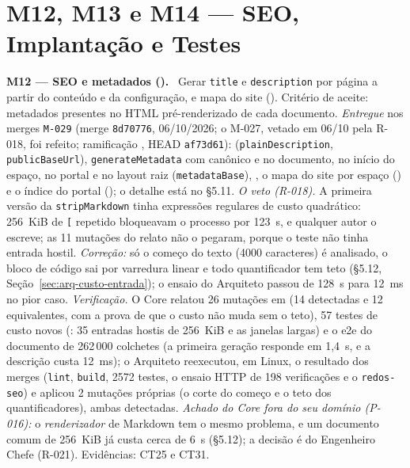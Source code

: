 \section{M12, M13 e M14 --- SEO, Implantação e Testes}\label{sec:impl-demais}

\textbf{M12 --- SEO e metadados ().} \ Gerar \texttt{title} e \texttt{description} por página a partir do conteúdo e da configuração,  e mapa do site (). Critério de aceite: metadados presentes no HTML pré-renderizado de cada documento. \emph{Entregue} nos merges \texttt{M-029} (merge \texttt{8d70776}, 06/10/2026; o M-027, vetado em 06/10 pela R-018, foi refeito; ramificação , HEAD \texttt{af73d61}):  (\texttt{plainDescription}, \texttt{publicBaseUrl}), \texttt{generateMetadata} com canônico e  no documento, no início do espaço, no portal e no layout raiz (\texttt{metadataBase}), , o mapa do site por espaço () e o índice do portal (); o detalhe está no \S5.11. \emph{O veto (R-018).} A primeira versão da \texttt{stripMarkdown} tinha expressões regulares de custo quadrático: 256~KiB de \texttt{[} repetido bloqueavam o processo por 123~s, e qualquer autor o escreve; as 11 mutações do relato não o pegaram, porque o teste não tinha entrada hostil. \emph{Correção:} só o começo do texto (4000 caracteres) é analisado, o bloco de código sai por varredura linear e todo quantificador tem teto (\S5.12, Seção~\ref{sec:arq-custo-entrada}); o ensaio  do Arquiteto passou de 128~s para 12~ms no pior caso. \emph{Verificação.} O Core relatou 26 mutações em  (14 detectadas e 12 equivalentes, com a prova de que o custo não muda sem o teto), 57 testes de custo novos (: 35 entradas hostis de 256~KiB e as janelas largas) e o e2e do documento de 262\,000 colchetes (a primeira geração responde em 1,4~s, e a descrição custa 12~ms); o Arquiteto reexecutou, em Linux, o resultado dos merges (\texttt{lint}, \texttt{build}, 2572 testes, o ensaio HTTP de 198 verificações e o \texttt{redos-seo}) e aplicou 2 mutações próprias (o corte do começo e o teto dos quantificadores), ambas detectadas. \emph{Achado do Core fora do seu domínio (P-016):} o \emph{renderizador} de Markdown tem o mesmo problema, e um documento comum de 256~KiB já custa cerca de 6~s (\S5.12); a decisão é do Engenheiro Chefe (R-021). Evidências: CT25 e CT31.

